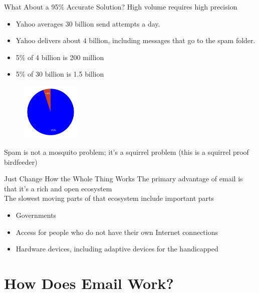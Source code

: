 \documentclass[nobackground,dvipsnames,table]{beamer}
\begin{document}
\begin{frame}{What About a 95\% Accurate Solution?}
    High volume requires high precision 
    \begin{itemize}
        \item Yahoo averages 30 billion send attempts a day.
        \item Yahoo delivers about 4 billion, including messages that go to the spam folder.
        \item 5\% of 4 billion is 200 million
        \item 5\% of 30 billion is 1.5 billion
    \end{itemize}
    \begin{figure}
        \includegraphics[width=0.25\textwidth]{95-percent}
    \end{figure}
\end{frame}

\begin{frame}{Spam is not a mosquito problem; it’s a squirrel problem}
    (this is a squirrel proof birdfeeder)
\end{frame}

\begin{frame}{Just Change How the Whole Thing Works}
    The primary advantage of email is that it’s a rich and open ecosystem\\
    The slowest moving parts of that ecosystem include important parts
    \begin{itemize}
        \item Governments
        \item Access for people who do not have their own Internet connections
        \item Hardware devices, including adaptive devices for the handicapped
    \end{itemize}
\end{frame}

\section{How Does Email Work?}
\end{document}
